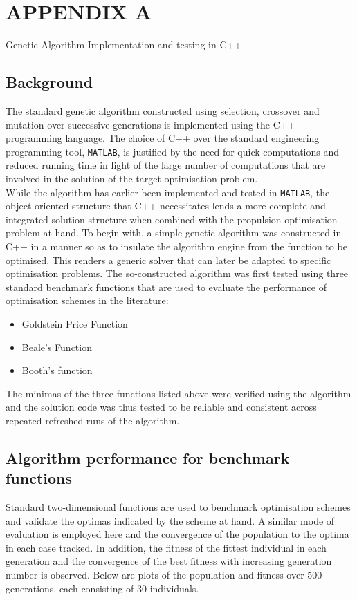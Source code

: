 \documentclass[ExampleMasters.tex]{subfiles}
\begin{document}
	\chapter{APPENDIX A}
	{\Large Genetic Algorithm Implementation and testing in C++}

	\section{Background}
		The standard genetic algorithm constructed using selection, crossover and mutation over successive generations is implemented using the C++ programming language. The choice of C++ over the standard engineering programming tool, \verb!MATLAB!, is justified by the need for quick computations and reduced running time in light of the large number of computations that are involved in the solution of the target optimisation problem. \\

		While the algorithm has earlier been implemented and tested in \verb!MATLAB!, the object oriented structure that C++ necessitates lends a more complete and integrated solution structure when combined with the propulsion optimisation problem at hand. To begin with, a simple genetic algorithm was constructed in C++ in a manner so as to insulate the algorithm engine from the function to be optimised. This renders a generic solver that can later be adapted to specific optimisation problems. The so-constructed algorithm was first tested using three standard benchmark functions that are used to evaluate the performance of optimisation schemes in the literature:
		\begin{itemize}
			\item Goldstein Price Function
			\item Beale's Function
			\item Booth's function
		\end{itemize}

		The minimas of the three functions listed above were verified using the algorithm and the solution code was thus tested to be reliable and consistent across repeated refreshed runs of the algorithm.\\

	\section{Algorithm performance for benchmark functions}

		Standard two-dimensional functions are used to benchmark optimisation schemes and validate the optimas indicated by the scheme at hand. A similar mode of evaluation is employed here and the convergence of the population to the optima in each case tracked. In addition, the fitness of the fittest individual in each generation and the convergence of the best fitness with increasing generation number is observed. Below are plots of the population and fitness over 500 generations, each consisting of 30 individuals.\\ 
\end{document}
